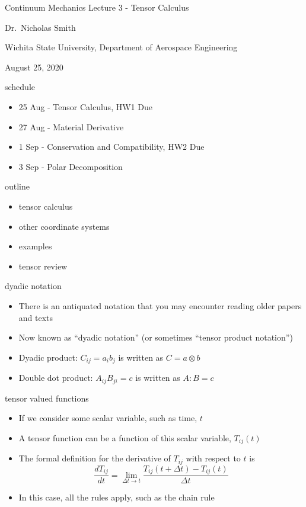 \begin{frame}{Continuum Mechanics}
\protect\hypertarget{continuum-mechanics}{}
Lecture 3 - Tensor Calculus

Dr.~Nicholas Smith

Wichita State University, Department of Aerospace Engineering

August 25, 2020
\end{frame}

\begin{frame}{schedule}
\protect\hypertarget{schedule}{}
\begin{itemize}
\tightlist
\item
  25 Aug - Tensor Calculus, HW1 Due
\item
  27 Aug - Material Derivative
\item
  1 Sep - Conservation and Compatibility, HW2 Due
\item
  3 Sep - Polar Decomposition
\end{itemize}
\end{frame}

\begin{frame}{outline}
\protect\hypertarget{outline}{}
\begin{itemize}
\tightlist
\item
  tensor calculus
\item
  other coordinate systems
\item
  examples
\item
  tensor review
\end{itemize}
\end{frame}

\begin{frame}{dyadic notation}
\protect\hypertarget{dyadic-notation}{}
\begin{itemize}
\tightlist
\item
  There is an antiquated notation that you may encounter reading older
  papers and texts
\item
  Now known as ``dyadic notation'' (or sometimes ``tensor product
  notation'')
\item
  Dyadic product: \(C_{ij} = a_i b_j\) is written as \(C = a \otimes b\)
\item
  Double dot product: \(A_{ij} B_{ji} = c\) is written as \(A : B = c\)
\end{itemize}
\end{frame}

\begin{frame}{tensor valued functions}
\protect\hypertarget{tensor-valued-functions}{}
\begin{itemize}
\tightlist
\item
  If we consider some scalar variable, such as time, \(t\)
\item
  A tensor function can be a function of this scalar variable,
  \(T_{ij}(t)\)
\item
  The formal definition for the derivative of \(T_{ij}\) with respect to
  \(t\) is
  \[\frac{dT_{ij}}{dt} = \lim_{\Delta t \to t} \frac{T_{ij}(t + \Delta t)-T_{ij}(t)}{\Delta t}\]
\item
  In this case, all the rules apply, such as the chain rule
\end{itemize}
\end{frame}

